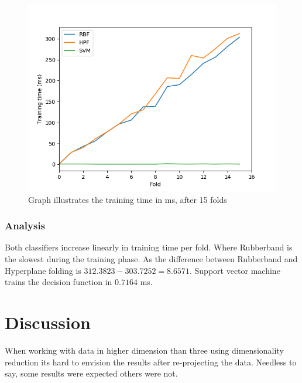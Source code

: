 \documentclass[a4paper,twoside]{bth}
\begin{document}
\begin{figure}[!htb]
\centering
\includegraphics[scale=0.7]{images/result-hep/hep_k_15/Trainingtime(ms).png}
   \caption{Graph illustrates the training time in ms, after 15 folds}
   \label{fig:hep-fit}
\end{figure}
\FloatBarrier
\subsection{Analysis}
Both classifiers increase linearly in training time per fold. Where Rubberband is the slowest during the training phase. As the difference between Rubberband and Hyperplane folding is $312.3823 - 303.7252 = 8.6571$. Support vector machine trains the decision function in $0.7164$ ms.



\chapter{Discussion}
\par When working with data in higher dimension than three using dimensionality reduction its hard to envision the results after re-projecting the data. Needless to say, some results were expected others were not. 
\end{document}
